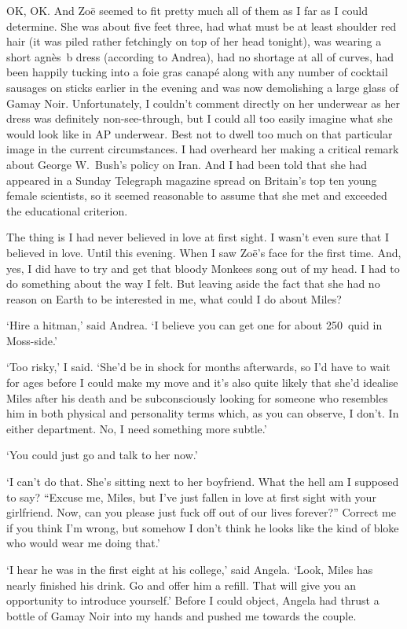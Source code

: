 OK, OK. And Zoë seemed to fit pretty much all of them as I far
as I could determine. She was about five feet three, had what must be at least shoulder red
hair (it was piled rather fetchingly on top of her head tonight), was
wearing a short agnès~b dress (according to Andrea), had no shortage at all of curves,
had been happily tucking into a foie gras canapé along with any
number of cocktail sausages on sticks earlier in the evening and was
now demolishing a large glass of Gamay Noir. Unfortunately,
I couldn't comment directly on her underwear as her dress was
definitely non-see-through, but I could all too easily imagine what
she would look like in AP underwear. Best not to dwell too much on
that particular image in the current circumstances. I had
overheard her making a critical remark about George W.~Bush's policy
on Iran. And I had been told that she had appeared in a {\twelvesl
Sunday Telegraph\/} magazine spread on Britain's top ten young
female scientists, so it seemed reasonable to assume that she met
and exceeded the educational criterion.

The thing is I had never believed in love at first sight. I wasn't
even sure that I believed in love. Until this evening. When I saw
Zoë's face for the first time. And, yes, I did have to try and
get that bloody Monkees song out of my head. I had to do
something about the way I felt. But leaving aside the fact that she had no reason on Earth to be
interested in me, what could I do about Miles?

`Hire a hitman,' said Andrea. `I believe you can get one for about
250~quid in Moss-side.'

`Too risky,' I said. `She'd be in shock for months afterwards, so
I'd have to wait for ages before I could make my move and it's also
quite likely that she'd idealise Miles after his death and be
subconsciously looking for someone who resembles him in both
physical and personality terms which, as you can observe, I don't. In
either department. No, I need something more subtle.'

`You could just go and talk to her now.'

`I can't do that. She's sitting next to her boyfriend.
What the hell am I supposed to say? ``Excuse me, Miles, but I've
just fallen in love at first sight with your girlfriend. Now, can
you please just fuck off out of our lives forever?'' Correct me if
you think I'm wrong, but somehow I don't think he looks like the
kind of bloke who would wear me doing that.'

`I hear he was in the first eight at his college,' said Angela. `Look, Miles has
nearly finished his drink. Go and offer him a refill. That will give
you an opportunity to introduce yourself.' Before I could object,
Angela had thrust a bottle of Gamay Noir into my hands and pushed me
towards the couple.

